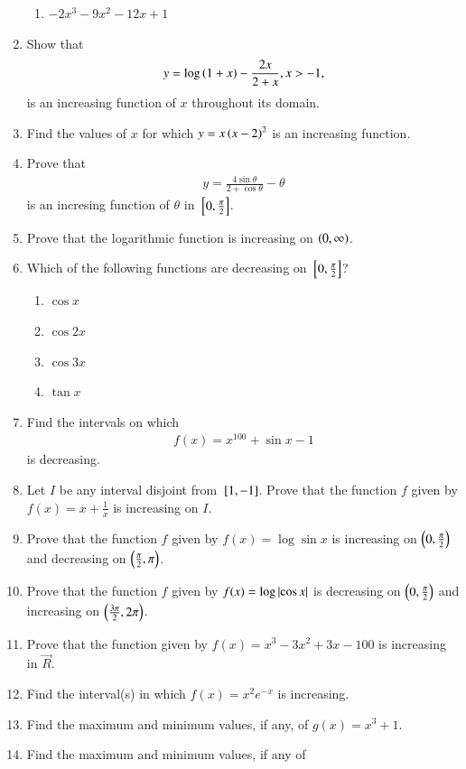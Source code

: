 \begin{enumerate}[label=\arabic*.,ref=\thesubsection.\theenumi]
\begin{enumerate}
\item $-2x^3-9x^2-12x+1$
\end{enumerate}
%
\item Show that 
%
\begin{align}
y = \log \left(1+x\right)-\frac{2x}{2+x}, x > -1,
\end{align}
%
is an increasing function of $x$ throughout its domain.
%
\item Find the values of $x$ for which $y = x\left(x-2\right)^2$ is an increasing function.
%
\item Prove that
%
\begin{align}
y = \frac{4\sin \theta}{2+\cos \theta} - \theta
\end{align}
%
is an incresing function of $\theta$ in ${}\left[0,\frac{\pi}{2}\right]$.
\item Prove that the logarithmic function is increasing on $\left(0, \infty\right)$.
\item Which of the following functions are decreasing on ${}\left[0,\frac{\pi}{2}\right]$?
%
\begin{enumerate}
\item $\cos x$
\item $\cos 2x$
\item $\cos 3x$
\item $\tan x$
\end{enumerate}
%
\item Find the intervals on which 
%
\begin{align}
f(x) = x^{100}+\sin x -1
\end{align}
%
is decreasing.
\item Let $I$ be any interval disjoint from ${}\left[1,-1\right]$.  Prove that the function $f$ given by $f(x) = x +\frac{1}{x}$ is increasing on $I$.
\item Prove that the function $f$ given by $f(x) = \log \sin x$ is increasing on $\left(0,\frac{\pi}{2}\right)$ and decreasing on $\left(\frac{\pi}{2}, \pi\right)$.
\item Prove that the function $f$ given by $f(x) = \log \left\vert\cos x\right\vert$ is decreasing on $\left(0,\frac{\pi}{2}\right)$ and increasing on $\left(\frac{3\pi}{2}, 2\pi\right)$.
\item Prove that the function given by $f(x) = x^3-3x^2+3x-100$ is increasing in $\vec{R}$.
\item Find the interval(s) in which $f(x) = x^2e^{-x}$ is increasing.
\item Find the maximum and minimum values, if any, of $g(x) = x^3+1$.
%
\item Find the maximum and minimum values, if any of

\end{enumerate}
